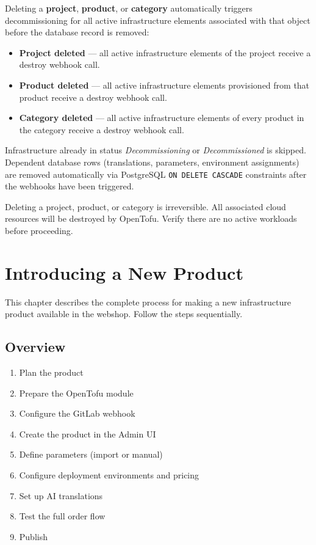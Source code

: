 \documentclass[12pt,a4paper,twoside]{report}
\newcommand{\warnbox}[1]{\begin{tcolorbox}[warnboxstyle]#1\end{tcolorbox}}
\newcommand{\code}[1]{\texttt{#1}}
\begin{document}
Deleting a \textbf{project}, \textbf{product}, or \textbf{category}
automatically triggers decommissioning for all active infrastructure elements
associated with that object before the database record is removed:

\begin{itemize}
  \item \textbf{Project deleted} — all active infrastructure elements of the
    project receive a destroy webhook call.
  \item \textbf{Product deleted} — all active infrastructure elements
    provisioned from that product receive a destroy webhook call.
  \item \textbf{Category deleted} — all active infrastructure elements of every
    product in the category receive a destroy webhook call.
\end{itemize}

Infrastructure already in status \textit{Decommissioning} or
\textit{Decommissioned} is skipped. Dependent database rows (translations,
parameters, environment assignments) are removed automatically via PostgreSQL
\code{ON DELETE CASCADE} constraints after the webhooks have been triggered.

\warnbox{Deleting a project, product, or category is irreversible. All associated
cloud resources will be destroyed by OpenTofu. Verify there are no active
workloads before proceeding.}

\chapter{Introducing a New Product}
\label{ch:new-product}

This chapter describes the complete process for making a new
infrastructure product available in the webshop. Follow the steps
sequentially.

\section{Overview}

\begin{enumerate}
  \item Plan the product
  \item Prepare the OpenTofu module
  \item Configure the GitLab webhook
  \item Create the product in the Admin UI
  \item Define parameters (import or manual)
  \item Configure deployment environments and pricing
  \item Set up AI translations
  \item Test the full order flow
  \item Publish
\end{enumerate}
\end{document}
